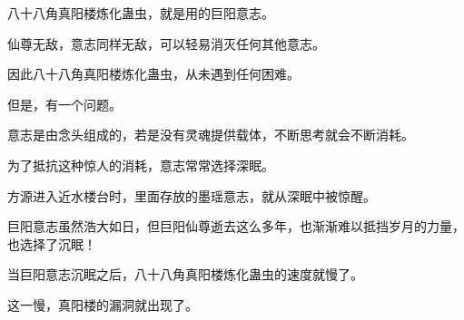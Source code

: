 \begin{this_body}
八十八角真阳楼炼化蛊虫，就是用的巨阳意志。

仙尊无敌，意志同样无敌，可以轻易消灭任何其他意志。

因此八十八角真阳楼炼化蛊虫，从未遇到任何困难。

但是，有一个问题。

意志是由念头组成的，若是没有灵魂提供载体，不断思考就会不断消耗。

为了抵抗这种惊人的消耗，意志常常选择深眠。

方源进入近水楼台时，里面存放的墨瑶意志，就从深眠中被惊醒。

巨阳意志虽然浩大如日，但巨阳仙尊逝去这么多年，也渐渐难以抵挡岁月的力量，也选择了沉眠！

当巨阳意志沉眠之后，八十八角真阳楼炼化蛊虫的速度就慢了。

这一慢，真阳楼的漏洞就出现了。

\end{this_body}


